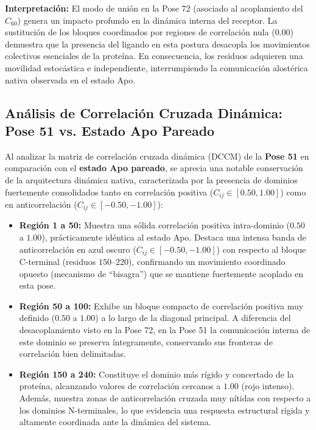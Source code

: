 \textbf{Interpretación:} El modo de unión en la Pose 72 (asociado al acoplamiento del $C_{60}$) genera un impacto profundo en la dinámica interna del receptor. La sustitución de los bloques coordinados por regiones de correlación nula ($0.00$) demuestra que la presencia del ligando en esta postura desacopla los movimientos colectivos esenciales de la proteína. En consecuencia, los residuos adquieren una movilidad estocástica e independiente, interrumpiendo la comunicación alostérica nativa observada en el estado Apo.

\subsection*{Análisis de Correlación Cruzada Dinámica: Pose 51 vs. Estado Apo Pareado}

Al analizar la matriz de correlación cruzada dinámica (DCCM) de la \textbf{Pose 51} en comparación con el \textbf{estado Apo pareado}, se aprecia una notable conservación de la arquitectura dinámica nativa, caracterizada por la presencia de dominios fuertemente consolidados tanto en correlación positiva ($C_{ij} \in [0.50, 1.00]$) como en anticorrelación ($C_{ij} \in [-0.50, -1.00]$):

\begin{itemize}
    \item \textbf{Región 1 a 50:} Muestra una sólida correlación positiva intra-dominio ($0.50$ a $1.00$), prácticamente idéntica al estado Apo. Destaca una intensa banda de anticorrelación en azul oscuro ($C_{ij} \in [-0.50, -1.00]$) con respecto al bloque C-terminal (residuos $150$--$220$), confirmando un movimiento coordinado opuesto (mecanismo de ``bisagra'') que se mantiene fuertemente acoplado en esta pose.
    
    \item \textbf{Región 50 a 100:} Exhibe un bloque compacto de correlación positiva muy definido ($0.50$ a $1.00$) a lo largo de la diagonal principal. A diferencia del desacoplamiento visto en la Pose 72, en la Pose 51 la comunicación interna de este dominio se preserva íntegramente, conservando sus fronteras de correlación bien delimitadas.
    
    \item \textbf{Región 150 a 240:} Constituye el dominio más rígido y concertado de la proteína, alcanzando valores de correlación cercanos a $1.00$ (rojo intenso). Además, muestra zonas de anticorrelación cruzada muy nítidas con respecto a los dominios N-terminales, lo que evidencia una respuesta estructural rígida y altamente coordinada ante la dinámica del sistema.
\end{itemize}

